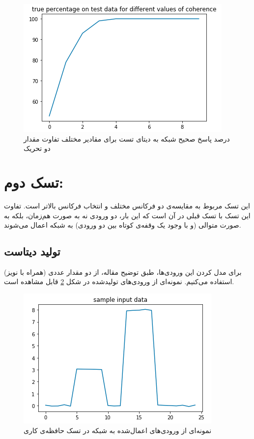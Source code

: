 \documentclass[a4paper]{article}
\begin{document}
\begin{figure}[h!]
	\centering
	\includegraphics[scale=0.7]{fig10.png}
	\caption{درصد پاسخ صحیح شبکه به دیتای تست برای مقادیر مختلف تفاوت مقدار دو تحریک}
	\label{fig10}
\end{figure}

\section{تسک دوم: }
این تسک مربوط به مقایسه‌ی دو فرکانس مختلف و انتخاب فرکانس بالاتر است. تفاوت این تسک با تسک قبلی در آن است که این بار، دو ورودی نه به صورت هم‌زمان، بلکه به صورت متوالی (و با وجود یک وقفه‌ی کوتاه بین دو ورودی) به شبکه اعمال می‌شوند. 
\subsection{تولید دیتاست}
برای مدل کردن این ورودی‌ها، طبق توضیح مقاله، از دو مقدار عددی (همراه با نویز) استفاده می‌کنیم. نمونه‌ای از ورودی‌های تولیدشده در شکل \ref{fig11} قابل مشاهده است.
\begin{figure}[h!]
	\centering
	\includegraphics[scale=0.7]{fig11.png}
	\caption{نمونه‌ای از ورودی‌های اعمال‌شده به شبکه در تسک حافظه‌ی کاری}
	\label{fig11}
\end{figure}
\end{document}
